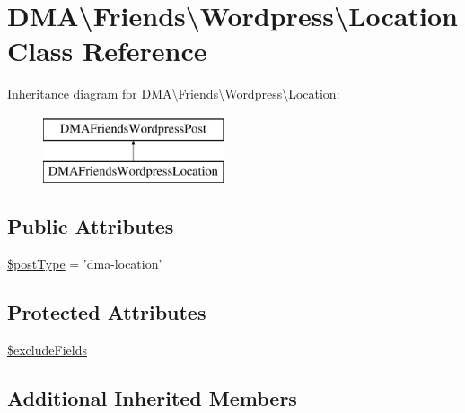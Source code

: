 \hypertarget{classDMA_1_1Friends_1_1Wordpress_1_1Location}{\section{D\-M\-A\textbackslash{}Friends\textbackslash{}Wordpress\textbackslash{}Location Class Reference}
\label{classDMA_1_1Friends_1_1Wordpress_1_1Location}
}
Inheritance diagram for D\-M\-A\textbackslash{}Friends\textbackslash{}Wordpress\textbackslash{}Location\-:\begin{figure}[H]
\begin{center}
\leavevmode
\includegraphics[height=2.000000cm]{d3/d8d/classDMA_1_1Friends_1_1Wordpress_1_1Location}
\end{center}
\end{figure}
\subsection*{Public Attributes}
\begin{DoxyCompactItemize}
\item 
\hyperlink{classDMA_1_1Friends_1_1Wordpress_1_1Location_a40f4ecf15a53d860bfbba3484f2999bf}{\$post\-Type} = 'dma-\/location'
\end{DoxyCompactItemize}
\subsection*{Protected Attributes}
\begin{DoxyCompactItemize}
\item 
\hyperlink{classDMA_1_1Friends_1_1Wordpress_1_1Location_ae18a475210d12a42d335d6ca6fb47811}{\$exclude\-Fields}
\end{DoxyCompactItemize}
\subsection*{Additional Inherited Members}


